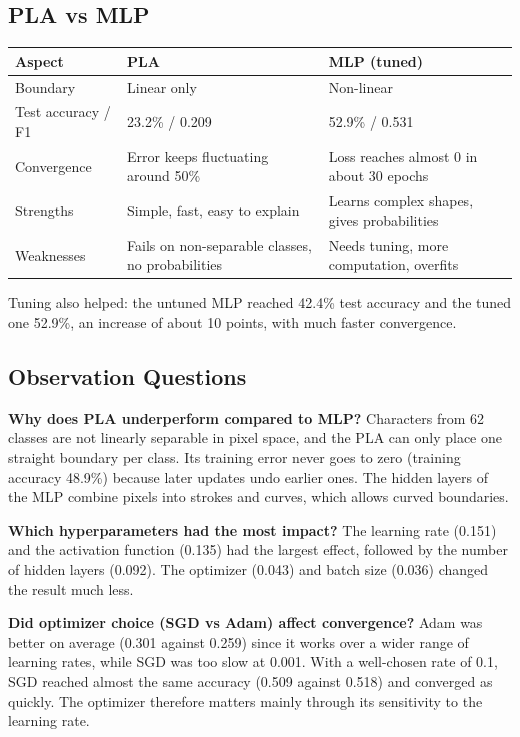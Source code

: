 \documentclass[12pt,a4paper]{article}
\begin{document}
\subsection{PLA vs MLP}
\begin{table}[H]
\centering
\begin{tabular}{p{3.2cm}p{5.7cm}p{5.7cm}}
\toprule
Aspect & PLA & MLP (tuned) \\
\midrule
Boundary & Linear only & Non-linear \\
Test accuracy / F1 & 23.2\% / 0.209 & 52.9\% / 0.531 \\
Convergence & Error keeps fluctuating around 50\% & Loss reaches almost 0 in about 30 epochs \\
Strengths & Simple, fast, easy to explain & Learns complex shapes, gives probabilities \\
Weaknesses & Fails on non-separable classes, no probabilities & Needs tuning, more computation, overfits \\
\bottomrule
\end{tabular}
\end{table}
Tuning also helped: the untuned MLP reached 42.4\% test accuracy and the tuned one 52.9\%, an increase of about 10 points, with much faster convergence.

\subsection{Observation Questions}
\textbf{Why does PLA underperform compared to MLP?}
Characters from 62 classes are not linearly separable in pixel space, and the PLA can only place one straight boundary per class. Its training error never goes to zero (training accuracy 48.9\%) because later updates undo earlier ones. The hidden layers of the MLP combine pixels into strokes and curves, which allows curved boundaries.

\textbf{Which hyperparameters had the most impact?}
The learning rate (0.151) and the activation function (0.135) had the largest effect, followed by the number of hidden layers (0.092). The optimizer (0.043) and batch size (0.036) changed the result much less.

\textbf{Did optimizer choice (SGD vs Adam) affect convergence?}
Adam was better on average (0.301 against 0.259) since it works over a wider range of learning rates, while SGD was too slow at 0.001. With a well-chosen rate of 0.1, SGD reached almost the same accuracy (0.509 against 0.518) and converged as quickly. The optimizer therefore matters mainly through its sensitivity to the learning rate.
\end{document}

